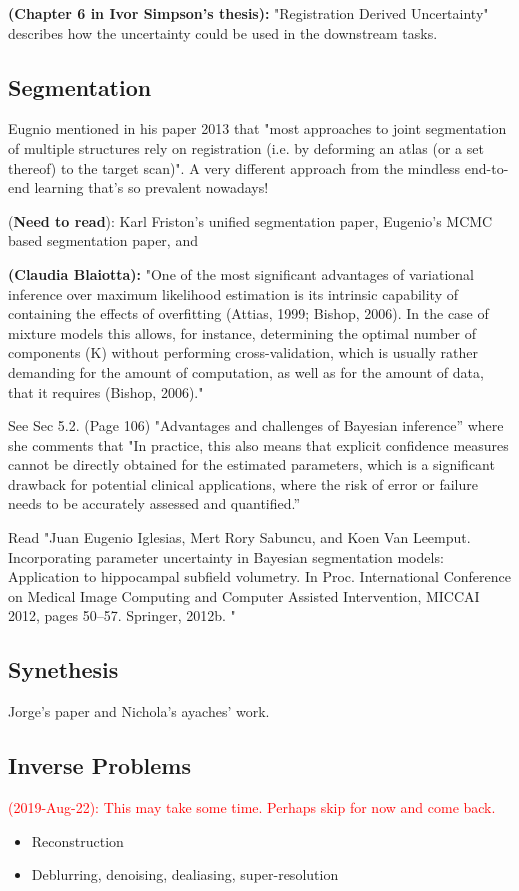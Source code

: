 \textbf{(Chapter 6 in Ivor Simpson's thesis):} "Registration Derived Uncertainty" describes how the uncertainty could be used in the downstream tasks. 

\subsection{Segmentation}
Eugnio mentioned in his paper 2013 \cite{iglesias2011combining} that "most approaches to joint segmentation of multiple structures rely on registration (i.e. by deforming an atlas (or a set thereof) to the target scan)". A very different approach from the mindless end-to-end learning that's so prevalent nowadays!  

(\textbf{Need to read}): Karl Friston's unified segmentation paper, Eugenio's MCMC based segmentation paper, and 

\textbf{(Claudia Blaiotta): } "One of the most significant advantages of variational inference over maximum likelihood estimation is its intrinsic capability of containing the effects of overfitting (Attias, 1999; Bishop, 2006). In the case of mixture models this allows, for instance, determining the optimal number of components (K) without performing cross-validation, which is usually rather demanding for the amount of computation, as well as for the amount of data, that it requires (Bishop, 2006)."

See Sec 5.2. (Page 106) "Advantages and challenges of Bayesian inference” where she comments that 
"In practice, this also means that explicit confidence measures cannot be directly obtained for the estimated parameters, which is a significant drawback for potential clinical applications, where the risk of error or failure needs to be accurately assessed and quantified.” 

Read "Juan Eugenio Iglesias, Mert Rory Sabuncu, and Koen Van Leemput. Incorporating parameter uncertainty in Bayesian segmentation models: Application to hippocampal subfield volumetry. In Proc. International Conference on Medical Image Computing and Computer Assisted Intervention, MICCAI 2012, pages 50–57. Springer, 2012b. "

\subsection{Synethesis}
Jorge's paper and Nichola's ayaches' work. 

\subsection{Inverse Problems}
\textcolor{red}{(2019-Aug-22): This may take some time. Perhaps skip for now and come back.}
\begin{itemize}
	\item Reconstruction
	\item Deblurring, denoising, dealiasing, super-resolution 
\end{itemize}


